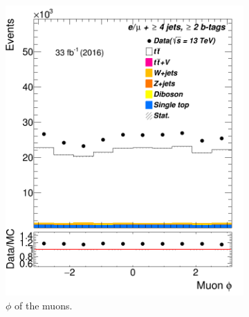 \begin{figure}
\begin{subfigure}{0.25\textwidth}
	\includegraphics[width=\linewidth]{ControlPlots_emujets_2016_4incl_2incl/mu_phi_emujets_2016.png}
	\caption{$\phi$ of the muons.} \label{fig:Sec18}
\end{subfigure}\hspace*{0.5cm}
	\begin{subfigure}{0.25\textwidth}

\end{subfigure}
\end{figure}
